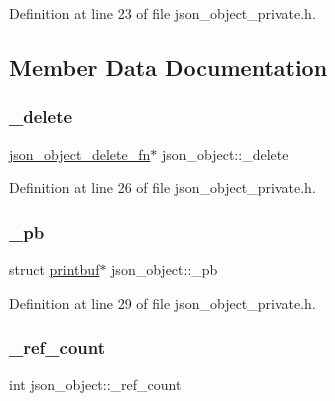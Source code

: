Definition at line 23 of file json\+\_\+object\+\_\+private.\+h.



\subsection{Member Data Documentation}
\mbox{\label{structjson__object_aa3a238f4b671c21fa0578fc37a126c2e}} 
\subsubsection{\texorpdfstring{\+\_\+delete}{\_delete}}
{\footnotesize\ttfamily \hyperlink{json__object__private_8h_a38067e570c75b31878ded6d8e554d560}{json\+\_\+object\+\_\+delete\+\_\+fn}$\ast$ json\+\_\+object\+::\+\_\+delete}



Definition at line 26 of file json\+\_\+object\+\_\+private.\+h.

\mbox{\label{structjson__object_afdcaa9e24bce7c86c33cb6f6ae65cb56}} 
\subsubsection{\texorpdfstring{\+\_\+pb}{\_pb}}
{\footnotesize\ttfamily struct \hyperlink{structprintbuf}{printbuf}$\ast$ json\+\_\+object\+::\+\_\+pb}



Definition at line 29 of file json\+\_\+object\+\_\+private.\+h.

\mbox{\label{structjson__object_aca9b93573ba6bb8cf66d87c170a575b2}} 
\subsubsection{\texorpdfstring{\+\_\+ref\+\_\+count}{\_ref\_count}}
{\footnotesize\ttfamily int json\+\_\+object\+::\+\_\+ref\+\_\+count}



